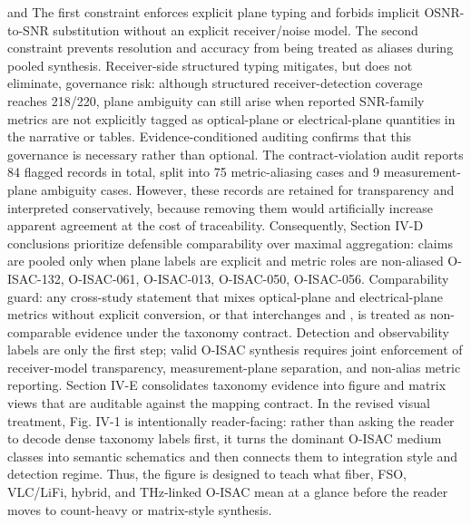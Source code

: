 {}and\markdownRendererSoftLineBreak
{}\markdownRendererSoftLineBreak
{}The first constraint enforces explicit plane typing and forbids implicit OSNR-to-SNR substitution without an explicit receiver/noise model. The second constraint prevents resolution and accuracy from being treated as aliases during pooled synthesis.\markdownRendererParagraphSeparator
{}Receiver-side structured typing mitigates, but does not eliminate, governance risk: although structured receiver-detection coverage reaches 218/220, plane ambiguity can still arise when reported SNR-family metrics are not explicitly tagged as optical-plane or electrical-plane quantities in the narrative or tables.\markdownRendererParagraphSeparator
{}Evidence-conditioned auditing confirms that this governance is necessary rather than optional. The contract-violation audit reports 84 flagged records in total, split into 75 metric-aliasing cases and 9 measurement-plane ambiguity cases. However, these records are retained for transparency and interpreted conservatively, because removing them would artificially increase apparent agreement at the cost of traceability. Consequently, Section IV-D conclusions prioritize defensible comparability over maximal aggregation: claims are pooled only when plane labels are explicit and metric roles are non-aliased O-ISAC-132, O-ISAC-061, O-ISAC-013, O-ISAC-050, O-ISAC-056.\markdownRendererParagraphSeparator
{}Comparability guard: any cross-study statement that mixes optical-plane and electrical-plane metrics without explicit conversion, or that interchanges  and , is treated as non-comparable evidence under the taxonomy contract.\markdownRendererParagraphSeparator
{} Detection and observability labels are only the first step; valid O-ISAC synthesis requires joint enforcement of receiver-model transparency, measurement-plane separation, and non-alias metric reporting.\markdownRendererInterblockSeparator
{}\markdownRendererThematicBreak{}\markdownRendererInterblockSeparator
{}
\markdownRendererSectionEnd 
\markdownRendererSectionEnd \markdownRendererSectionBegin
{}\markdownRendererInterblockSeparator
{}\markdownRendererSectionBegin
{}\markdownRendererInterblockSeparator
{}Section IV-E consolidates taxonomy evidence into figure and matrix views that are auditable against the mapping contract. In the revised visual treatment, Fig. IV-1 is intentionally reader-facing: rather than asking the reader to decode dense taxonomy labels first, it turns the dominant O-ISAC medium classes into semantic schematics and then connects them to integration style and detection regime. Thus, the figure is designed to teach what fiber, FSO, VLC/LiFi, hybrid, and THz-linked O-ISAC mean at a glance before the reader moves to count-heavy or matrix-style synthesis.\markdownRendererParagraphSeparator
